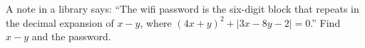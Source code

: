 A note in a library says: ``The wifi password is the six-digit block that repeats in the decimal expansion of $x-y$, where $(4x+y)^2+|3x-8y-2|=0$.'' Find $x-y$ and the password.
